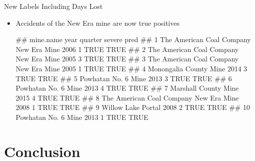 \documentclass[]{beamer}
\providecommand{\tightlist}{%
  \setlength{\itemsep}{0pt}\setlength{\parskip}{0pt}}
\let\oldverbatim\verbatim
\let\endoldverbatim\endverbatim
\renewenvironment{verbatim}{\footnotesize\oldverbatim}{\endoldverbatim}
\begin{document}
\begin{frame}[fragile]{New Labels Including Days Lost}

\begin{itemize}[<+->]
\tightlist
\item
  Accidents of the New Era mine are now true positives


\begin{verbatim}
##                                 mine.name year quarter severe pred
## 1  The American Coal Company New Era Mine 2006       1   TRUE TRUE
## 2  The American Coal Company New Era Mine 2005       3   TRUE TRUE
## 3  The American Coal Company New Era Mine 2005       1   TRUE TRUE
## 4                  Monongalia County Mine 2014       3   TRUE TRUE
## 5                     Powhatan No. 6 Mine 2013       3   TRUE TRUE
## 6                     Powhatan No. 6 Mine 2013       4   TRUE TRUE
## 7                    Marshall County Mine 2015       4   TRUE TRUE
## 8  The American Coal Company New Era Mine 2008       1   TRUE TRUE
## 9                      Willow Lake Portal 2008       2   TRUE TRUE
## 10                    Powhatan No. 6 Mine 2013       1   TRUE TRUE
\end{verbatim}
\end{itemize}
\end{frame}

\section{Conclusion}\label{conclusion}
\end{document}
